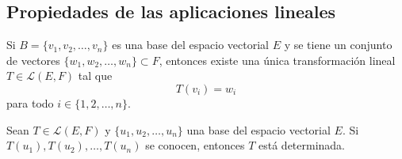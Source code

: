 \documentclass[compacto,10pt]{pubciencias-notas}
\begin{document}

\newpage

\subsection{Propiedades de las aplicaciones lineales}



\begin{prop}
Si $B = \{v_1, v_2, \ldots, v_n\}$ es una base del espacio vectorial $E$ y se tiene un conjunto de vectores $\{w_1, w_2, \ldots, w_n\} \subset F$, entonces existe una única transformación lineal $T \in \mathscr{L}(E,F)$ tal que
\[
    T(v_i) = w_i
\]
para todo $i\in \{1, 2, \ldots, n\}$.
\end{prop}


\begin{prop}
    Sean $T \in \mathscr{L}(E,F)$ y $\{u_1,u_2,\ldots,u_n\}$ una base del espacio vectorial $E$. Si $T(u_1),T(u_2),\ldots,T(u_n)$ se conocen, entonces $T$ está determinada.
\end{prop}
\end{document}
